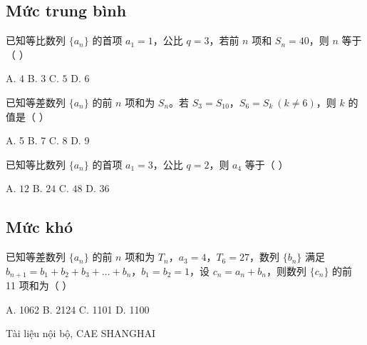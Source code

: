 \documentclass[11pt, a4paper]{article}
\begin{document}
\subsection{Mức trung bình}

\begin{baitap}[7]
已知等比数列 $\{a_n\}$ 的首项 $a_1 = 1$，公比 $q = 3$，若前 $n$ 项和 $S_n = 40$，则 $n$ 等于（ ）
\par\vspace{3pt}
\noindent A. $4$ \quad B. $3$ \quad C. $5$ \quad D. $6$
\end{baitap}
\begin{baitap}[8]
已知等差数列 $\{a_n\}$ 的前 $n$ 项和为 $S_n$。若 $S_3=S_{10}$，$S_6=S_k\ (k\ne6)$，则 $k$ 的值是（ ）
\par\vspace{3pt}
\noindent A. 5 \quad B. 7 \quad C. 8 \quad D. 9
\end{baitap}
\begin{baitap}[9]
已知等比数列 $\{a_n\}$ 的首项 $a_1 = 3$，公比 $q = 2$，则 $a_4$ 等于（ ）
\par\vspace{3pt}
\noindent A. $12$ \quad B. $24$ \quad C. $48$ \quad D. $36$
\end{baitap}
\subsection{Mức khó}

\begin{baitap}[10]
已知等差数列 $\{a_n\}$ 的前 $n$ 项和为 $T_n$，$a_3 = 4$，$T_6 = 27$，数列 $\{b_n\}$ 满足 $b_{n + 1} = b_1 + b_2 + b_3 + \dots + b_n$，$b_1 = b_2 = 1$，设 $c_n = a_n + b_n$，则数列 $\{c_n\}$ 的前 11 项和为（ ）
\par\vspace{3pt}
\noindent A. 1062 \quad B. 2124 \quad C. 1101 \quad D. 1100
\end{baitap}
\vspace{0.8cm}
\begin{center}
{\footnotesize\color{cae_blue} Tài liệu nội bộ, CAE SHANGHAI}
\end{center}
\end{document}
